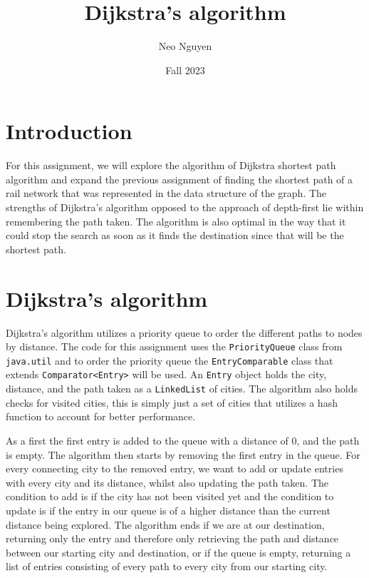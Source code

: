 \documentclass[a4paper,11pt]{article}
\begin{document}
\title{
    \textbf{Dijkstra's algorithm}
}
\author{Neo Nguyen}
\date{Fall 2023}

\maketitle

\section*{Introduction}

    For this assignment, we will explore the algorithm of Dijkstra shortest path algorithm and expand the previous assignment of finding the shortest path of a rail network that was represented in the data structure of the graph. The strengths of Dijkstra's algorithm opposed to the approach of depth-first lie within remembering the path taken. The algorithm is also optimal in the way that it could stop the search as soon as it finds the destination since that will be the shortest path.
    
\section*{Dijkstra's algorithm}

    Dijkstra's algorithm utilizes a priority queue to order the different paths to nodes by distance. The code for this assignment uses the \texttt{PriorityQueue} class from \texttt{java.util} and to order the priority queue the \texttt{EntryComparable} class that extends \texttt{Comparator<Entry>} will be used. An \texttt{Entry} object holds the city, distance, and the path taken as a \texttt{LinkedList} of cities. The algorithm also holds checks for visited cities, this is simply just a set of cities that utilizes a hash function to account for better performance.

    As a first the first entry is added to the queue with a distance of 0, and the path is empty. The algorithm then starts by removing the first entry in the queue. For every connecting city to the removed entry, we want to add or update entries with every city and its distance, whilst also updating the path taken. The condition to add is if the city has not been visited yet and the condition to update is if the entry in our queue is of a higher distance than the current distance being explored. The algorithm ends if we are at our destination, returning only the entry and therefore only retrieving the path and distance between our starting city and destination, or if the queue is empty, returning a list of entries consisting of every path to every city from our starting city.
    
\end{document}
